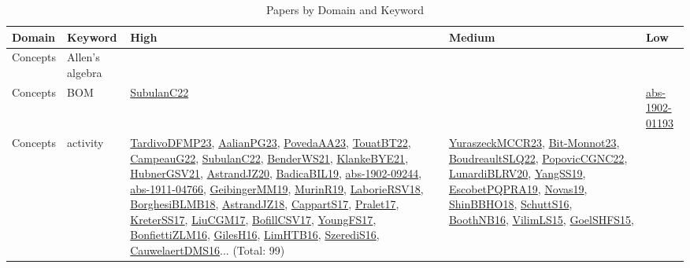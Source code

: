 {\scriptsize
\begin{longtable}{lp{3cm}>{\raggedright}p{6cm}>{\raggedright}p{6cm}p{8cm}}
\caption{Papers by Domain and Keyword}\\ \toprule
Domain & Keyword & High & Medium & Low\\ \midrule\endhead
\bottomrule
\endfoot
Concepts & Allen's algebra &  &  & \\
Concepts & BOM & \href{articles/SubulanC22.pdf}{SubulanC22}\cite{SubulanC22} &  & \href{articles/abs-1902-01193.pdf}{abs-1902-01193}\cite{abs-1902-01193}\\
Concepts & activity & \href{papers/TardivoDFMP23.pdf}{TardivoDFMP23}\cite{TardivoDFMP23}, \href{papers/AalianPG23.pdf}{AalianPG23}\cite{AalianPG23}, \href{papers/PovedaAA23.pdf}{PovedaAA23}\cite{PovedaAA23}, \href{papers/TouatBT22.pdf}{TouatBT22}\cite{TouatBT22}, \href{articles/CampeauG22.pdf}{CampeauG22}\cite{CampeauG22}, \href{articles/SubulanC22.pdf}{SubulanC22}\cite{SubulanC22}, \href{papers/BenderWS21.pdf}{BenderWS21}\cite{BenderWS21}, \href{papers/KlankeBYE21.pdf}{KlankeBYE21}\cite{KlankeBYE21}, \href{articles/HubnerGSV21.pdf}{HubnerGSV21}\cite{HubnerGSV21}, \href{articles/AstrandJZ20.pdf}{AstrandJZ20}\cite{AstrandJZ20}, \href{papers/BadicaBIL19.pdf}{BadicaBIL19}\cite{BadicaBIL19}, \href{articles/abs-1902-09244.pdf}{abs-1902-09244}\cite{abs-1902-09244}, \href{articles/abs-1911-04766.pdf}{abs-1911-04766}\cite{abs-1911-04766}, \href{papers/GeibingerMM19.pdf}{GeibingerMM19}\cite{GeibingerMM19}, \href{papers/MurinR19.pdf}{MurinR19}\cite{MurinR19}, \href{articles/LaborieRSV18.pdf}{LaborieRSV18}\cite{LaborieRSV18}, \href{articles/BorghesiBLMB18.pdf}{BorghesiBLMB18}\cite{BorghesiBLMB18}, \href{papers/AstrandJZ18.pdf}{AstrandJZ18}\cite{AstrandJZ18}, \href{papers/CappartS17.pdf}{CappartS17}\cite{CappartS17}, \href{papers/Pralet17.pdf}{Pralet17}\cite{Pralet17}, \href{articles/KreterSS17.pdf}{KreterSS17}\cite{KreterSS17}, \href{papers/LiuCGM17.pdf}{LiuCGM17}\cite{LiuCGM17}, \href{papers/BofillCSV17.pdf}{BofillCSV17}\cite{BofillCSV17}, \href{papers/YoungFS17.pdf}{YoungFS17}\cite{YoungFS17}, \href{papers/BonfiettiZLM16.pdf}{BonfiettiZLM16}\cite{BonfiettiZLM16}, \href{papers/GilesH16.pdf}{GilesH16}\cite{GilesH16}, \href{papers/LimHTB16.pdf}{LimHTB16}\cite{LimHTB16}, \href{papers/SzerediS16.pdf}{SzerediS16}\cite{SzerediS16}, \href{papers/CauwelaertDMS16.pdf}{CauwelaertDMS16}\cite{CauwelaertDMS16}... (Total: 99) & \href{articles/YuraszeckMCCR23.pdf}{YuraszeckMCCR23}\cite{YuraszeckMCCR23}, \href{papers/Bit-Monnot23.pdf}{Bit-Monnot23}\cite{Bit-Monnot23}, \href{papers/BoudreaultSLQ22.pdf}{BoudreaultSLQ22}\cite{BoudreaultSLQ22}, \href{papers/PopovicCGNC22.pdf}{PopovicCGNC22}\cite{PopovicCGNC22}, \href{articles/LunardiBLRV20.pdf}{LunardiBLRV20}\cite{LunardiBLRV20}, \href{papers/YangSS19.pdf}{YangSS19}\cite{YangSS19}, \href{articles/EscobetPQPRA19.pdf}{EscobetPQPRA19}\cite{EscobetPQPRA19}, \href{articles/Novas19.pdf}{Novas19}\cite{Novas19}, \href{articles/ShinBBHO18.pdf}{ShinBBHO18}\cite{ShinBBHO18}, \href{papers/SchuttS16.pdf}{SchuttS16}\cite{SchuttS16}, \href{papers/BoothNB16.pdf}{BoothNB16}\cite{BoothNB16}, \href{papers/VilimLS15.pdf}{VilimLS15}\cite{VilimLS15}, \href{articles/GoelSHFS15.pdf}{GoelSHFS15}\cite{GoelSHFS15}, 
\end{longtable}}
